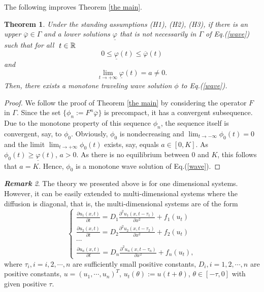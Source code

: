 \documentclass[12pt,letterpaper]{amsart}
\newtheorem{theorem}{Theorem}[section]
\theoremstyle{definition}
\theoremstyle{remark}
\newtheorem{remark}[theorem]{{\bf Remark}}
\numberwithin{equation}{section}
\begin{document}
The following improves Theorem \ref{the main}.
\begin{theorem}\label{the main2}
Under the standing assumptions (H1), (H2), (H3), if there is an upper $\overline{\varphi} \in \Gamma$ and a lower solutions $\underline{\varphi}$
that is not necessarily in $\Gamma$ of Eq.(\ref{wave}) such that for all $ \ t\in \mathbb R $
$$
0\le  \underline{\varphi}(t)\le \overline{\varphi}(t) 
$$
and 
$$
\lim_{t\to+\infty} \underline{\varphi}(t)=a \not=0.
$$
Then, there exists a monotone traveling wave solution $\phi$ to Eq.(\ref{wave}).
\end{theorem}
\begin{proof}
We follow the proof of Theorem \ref{the main} by considering the operator $F$ in $\Gamma$. Since the set $\{ \phi_n:=F^n\overline{\varphi} \}$ is precompact, it has a convergent subsequence. Due to the monotone property of this sequence $\phi_n$, the sequence itself is convergent, say, to $\phi_0$. Obviously, $\phi_0$ is nondecreasing and $\lim_{t\to-\infty}\phi_0(t)=0$ and the limit $\lim_{t\to+\infty}\phi_0(t)$ exists, say, equals $a\in [0,K]$. As $\phi_0(t)\ge \underline{\varphi} (t)$, $a>0$. As there is no equilibrium between $0$ and $K$, this follows that $a=K$. Hence, $\phi_0$ is a monotone wave solution of Eq.(\ref{wave}).
\end{proof}
\begin{remark}
The theory we presented above is for one dimensional systems. However, it can be easily extended to multi-dimensional systems where the diffusion is diagonal, that is, the multi-dimensional systems are of the form
\begin{equation}
\begin{cases}
\frac{\partial u_1(x,t)}{\partial t}=D_1\frac{\partial^2 u_1(x,t-\tau_1)}{\partial x^2} +f_1(u_t)\\
\frac{\partial u_2(x,t)}{\partial t}=D_2\frac{\partial^2 u_2(x,t-\tau_2)}{\partial x^2} +f_2(u_t)\\
\cdots  \\
\frac{\partial u_n(x,t)}{\partial t}=D_n\frac{\partial^2 u_n(x,t-\tau_n)}{\partial x^2} +f_n(u_t),
\end{cases}
\end{equation}
where $\tau_i, i=i,2,\cdots ,n$ are sufficiently small positive constants, $D_i,i=1,2,\cdots,n$ are positive constants, $u=(u_1,\cdots ,u_n)^T$, $u_t(\theta ):= u(t+\theta )$, $\theta \in [-\tau, 0]$ with given positive $\tau$.
\end{remark}
\end{document}

